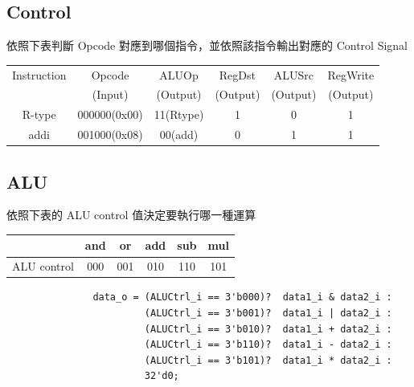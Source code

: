\documentclass[12t, a4paper]{article}
\begin{document}
\begin{CJK}{UTF8}{bkai}
		\subsection{Control}
			依照下表判斷 Opcode 對應到哪個指令，並依照該指令輸出對應的 Control Signal \par \vspace{0.2cm}
			\begin{tabular}[c]{|c|c|c|c|c|c|}
			\hline
				Instruction	& Opcode & ALUOp & RegDst & ALUSrc & RegWrite \\
				&(Input)&(Output)&(Output)&(Output)&(Output)\\
			\hline
				R-type & 000000(0x00) & 11(Rtype) & 1 & 0 & 1 \\
			\hline
				addi & 001000(0x08) & 00(add) & 0 & 1 & 1 \\
			\hline
			\end{tabular}

		\subsection{ALU}
			依照下表的 ALU control 值決定要執行哪一種運算 \par \vspace{0.2cm}
			\begin{tabular}[c]{|c|c|c|c|c|c|}
			\hline
							&and	&or		&add 	&sub 	&mul \\
			\hline
				ALU control &000 	&001 	&010 	&110 	&101 \\
			\hline
			\end{tabular}  \vspace{0.1cm}
			\begin{verbatim}
			   data_o = (ALUCtrl_i == 3'b000)?	data1_i & data2_i :
			            (ALUCtrl_i == 3'b001)?	data1_i | data2_i :
			            (ALUCtrl_i == 3'b010)?	data1_i + data2_i :
			            (ALUCtrl_i == 3'b110)?	data1_i - data2_i :
			            (ALUCtrl_i == 3'b101)?	data1_i * data2_i :
			            32'd0;
			\end{verbatim}
			

\end{CJK}
\end{document}
